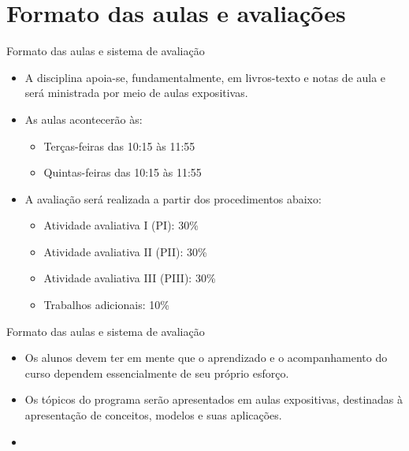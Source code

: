 \documentclass[10pt]{beamer}
\begin{document}
\section{Formato das aulas e avaliações}
\begin{frame}{Formato das aulas e sistema de avaliação}
    \begin{itemize}
        \item A disciplina apoia-se, fundamentalmente, em livros-texto e notas de aula e será ministrada por meio de aulas expositivas.\bigskip

        \item As aulas acontecerão às:\medskip
              \begin{itemize}
                  \item Terças-feiras das 10:15 às 11:55
                  \item Quintas-feiras das 10:15 às 11:55\bigskip
              \end{itemize}

        \item A avaliação será realizada a partir dos procedimentos abaixo:\medskip
              \begin{itemize}
                  \item Atividade avaliativa I (PI): 30\%
                  \item Atividade avaliativa II (PII): 30\%
                  \item Atividade avaliativa III (PIII): 30\%
                  \item Trabalhos adicionais: 10\%
              \end{itemize}
    \end{itemize}
\end{frame}

\begin{frame}{Formato das aulas e sistema de avaliação}
    \begin{itemize}
        \item Os alunos devem ter em mente que o aprendizado e o acompanhamento do curso dependem essencialmente de seu próprio esforço.\bigskip

        \item Os tópicos do programa serão apresentados em aulas expositivas, destinadas à apresentação de conceitos, modelos e suas aplicações.\bigskip

        \item[\emoji{warning}] 
    \end{itemize}
\end{frame}
\end{document}
